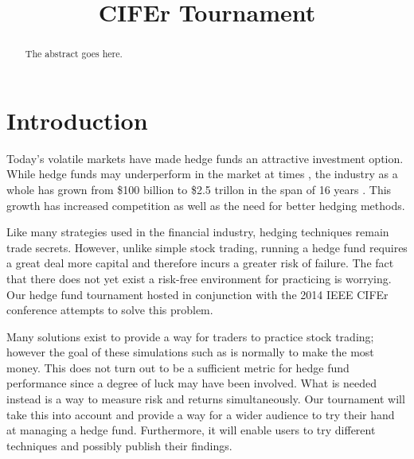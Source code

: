 \documentclass[conference, draftcls]{IEEEtran}
\begin{document}
\title{CIFEr Tournament}

\author{
  \and
}


\maketitle

\begin{abstract}
The abstract goes here.
\end{abstract}

\IEEEpeerreviewmaketitle

\section{Introduction}
Today's volatile markets have made hedge funds an attractive investment option. While hedge funds may underperform in the market at times \cite{amin2003}, the industry as a whole has grown from \$100 billion to \$2.5 trillon in the span of 16 years \cite{growth}. This growth has increased competition as well as the need for better hedging methods.

Like many strategies used in the financial industry, hedging techniques remain trade secrets. However, unlike simple stock trading, running a hedge fund requires a great deal more capital and therefore incurs a greater risk of failure. The fact that there does not yet exist a risk-free environment for practicing is worrying. Our hedge fund tournament hosted in conjunction with the 2014 IEEE CIFEr conference attempts to solve this problem.

Many solutions exist to provide a way for traders to practice stock trading; however the goal of these simulations such as \cite{wallstreetsurvivor} is normally to make the most money. This does not turn out to be a sufficient metric for hedge fund performance since a degree of luck may have been involved. What is needed instead is a way to measure risk and returns simultaneously. Our tournament will take this into account and provide a way for a wider audience to try their hand at managing a hedge fund. Furthermore, it will enable users to try different techniques and possibly publish their findings.
\end{document}
